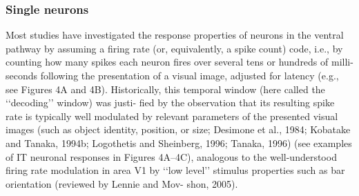 \subsubsection{Single neurons}
Most studies have investigated the response properties of
neurons in the ventral pathway by assuming a firing rate (or,
equivalently, a spike count) code, i.e., by counting how many
spikes each neuron fires over several tens or hundreds of milli-
seconds following the presentation of a visual image, adjusted
for latency (e.g., see Figures 4A and 4B). Historically, this
temporal window (here called the ‘‘decoding’’ window) was justi-
fied by the observation that its resulting spike rate is typically well
modulated by relevant parameters of the presented visual
images (such as object identity, position, or size; Desimone
et al., 1984; Kobatake and Tanaka, 1994b; Logothetis and
Sheinberg, 1996; Tanaka, 1996) (see examples of IT neuronal
responses in Figures 4A–4C), analogous to the well-understood
firing rate modulation in area V1 by ‘‘low level’’ stimulus
properties such as bar orientation (reviewed by Lennie and Mov-
shon, 2005).

